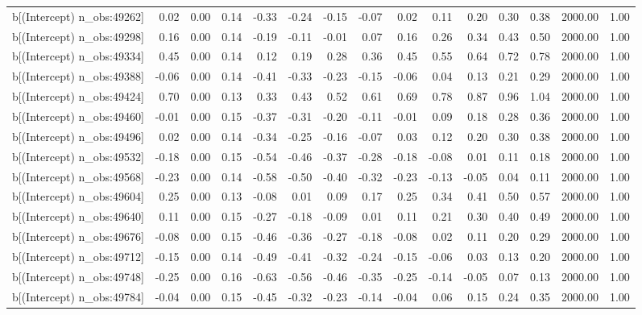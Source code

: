 \begin{table}[ht]
\begin{tabular}{rrrrrrrrrrrrrrr}
  b[(Intercept) n\_obs:49262] & 0.02 & 0.00 & 0.14 & -0.33 & -0.24 & -0.15 & -0.07 & 0.02 & 0.11 & 0.20 & 0.30 & 0.38 & 2000.00 & 1.00 \\ 
  b[(Intercept) n\_obs:49298] & 0.16 & 0.00 & 0.14 & -0.19 & -0.11 & -0.01 & 0.07 & 0.16 & 0.26 & 0.34 & 0.43 & 0.50 & 2000.00 & 1.00 \\ 
  b[(Intercept) n\_obs:49334] & 0.45 & 0.00 & 0.14 & 0.12 & 0.19 & 0.28 & 0.36 & 0.45 & 0.55 & 0.64 & 0.72 & 0.78 & 2000.00 & 1.00 \\ 
  b[(Intercept) n\_obs:49388] & -0.06 & 0.00 & 0.14 & -0.41 & -0.33 & -0.23 & -0.15 & -0.06 & 0.04 & 0.13 & 0.21 & 0.29 & 2000.00 & 1.00 \\ 
  b[(Intercept) n\_obs:49424] & 0.70 & 0.00 & 0.13 & 0.33 & 0.43 & 0.52 & 0.61 & 0.69 & 0.78 & 0.87 & 0.96 & 1.04 & 2000.00 & 1.00 \\ 
  b[(Intercept) n\_obs:49460] & -0.01 & 0.00 & 0.15 & -0.37 & -0.31 & -0.20 & -0.11 & -0.01 & 0.09 & 0.18 & 0.28 & 0.36 & 2000.00 & 1.00 \\ 
  b[(Intercept) n\_obs:49496] & 0.02 & 0.00 & 0.14 & -0.34 & -0.25 & -0.16 & -0.07 & 0.03 & 0.12 & 0.20 & 0.30 & 0.38 & 2000.00 & 1.00 \\ 
  b[(Intercept) n\_obs:49532] & -0.18 & 0.00 & 0.15 & -0.54 & -0.46 & -0.37 & -0.28 & -0.18 & -0.08 & 0.01 & 0.11 & 0.18 & 2000.00 & 1.00 \\ 
  b[(Intercept) n\_obs:49568] & -0.23 & 0.00 & 0.14 & -0.58 & -0.50 & -0.40 & -0.32 & -0.23 & -0.13 & -0.05 & 0.04 & 0.11 & 2000.00 & 1.00 \\ 
  b[(Intercept) n\_obs:49604] & 0.25 & 0.00 & 0.13 & -0.08 & 0.01 & 0.09 & 0.17 & 0.25 & 0.34 & 0.41 & 0.50 & 0.57 & 2000.00 & 1.00 \\ 
  b[(Intercept) n\_obs:49640] & 0.11 & 0.00 & 0.15 & -0.27 & -0.18 & -0.09 & 0.01 & 0.11 & 0.21 & 0.30 & 0.40 & 0.49 & 2000.00 & 1.00 \\ 
  b[(Intercept) n\_obs:49676] & -0.08 & 0.00 & 0.15 & -0.46 & -0.36 & -0.27 & -0.18 & -0.08 & 0.02 & 0.11 & 0.20 & 0.29 & 2000.00 & 1.00 \\ 
  b[(Intercept) n\_obs:49712] & -0.15 & 0.00 & 0.14 & -0.49 & -0.41 & -0.32 & -0.24 & -0.15 & -0.06 & 0.03 & 0.13 & 0.20 & 2000.00 & 1.00 \\ 
  b[(Intercept) n\_obs:49748] & -0.25 & 0.00 & 0.16 & -0.63 & -0.56 & -0.46 & -0.35 & -0.25 & -0.14 & -0.05 & 0.07 & 0.13 & 2000.00 & 1.00 \\ 
  b[(Intercept) n\_obs:49784] & -0.04 & 0.00 & 0.15 & -0.45 & -0.32 & -0.23 & -0.14 & -0.04 & 0.06 & 0.15 & 0.24 & 0.35 & 2000.00 & 1.00 \\ 

\end{tabular}
\end{table}
